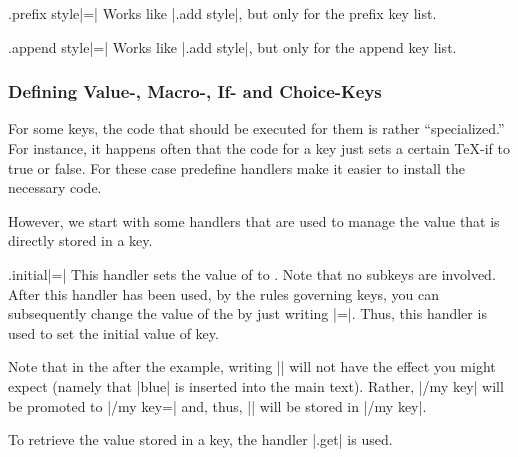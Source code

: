 \begin{handler}{{.prefix style}|=|}
  Works like |.add style|, but only for the prefix key list.
\end{handler}

\begin{handler}{{.append style}|=|}
  Works like |.add style|, but only for the append key list.
\end{handler}


\subsubsection{Defining Value-, Macro-, If- and Choice-Keys}

For some keys, the code that should be executed for them is rather
``specialized.'' For instance, it happens often that the code for a
key just sets a certain \TeX-if to true or false. For these case
predefine handlers make it easier to install the necessary code.

However, we start with some handlers that are used to manage the value
that is directly stored in a key.

\begin{handler}{{.initial}|=|}
  This handler sets the value of  to . Note that
  no subkeys are involved. After this handler has been used, by the
  rules governing keys, you can subsequently change the value of the
   by just writing |=|. Thus, this
  handler is used to set the initial value of key.

\begin{codeexample}
\end{codeexample}

  Note that in the after the example, writing || will not
  have the effect you might expect (namely that |blue| is inserted
  into the main text). Rather, |/my key| will be promoted to
  |/my key=\pgfkeysnovalue| and, thus, |\pgfkeysnovalue| will be
  stored in |/my key|.

  To retrieve the value stored in a key, the handler |.get| is used.
\end{handler}


